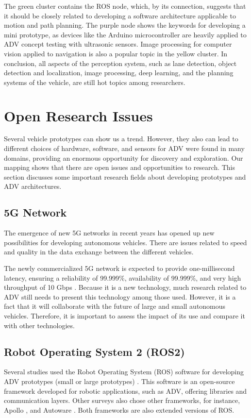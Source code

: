 \documentclass[lettersize,journal]{IEEEtran}
\begin{document}
The green cluster contains the ROS node, which, by its connection, suggests that it should be closely related to developing a software architecture applicable to motion and path planning. The purple node shows the keywords for developing a mini prototype, as devices like the Arduino microcontroller are heavily applied to ADV concept testing with ultrasonic sensors. Image processing for computer vision applied to navigation is also a popular topic in the yellow cluster. In conclusion, all aspects of the perception system, such as lane detection, object detection and localization, image processing, deep learning, and the planning systems of the vehicle, are still hot topics among researchers.

\color{black}
\section{Open Research Issues}

Several vehicle prototypes can show us a trend. However, they also can lead to different choices of hardware, software, and sensors for ADV were found in many domains, providing an enormous opportunity for discovery and exploration. Our mapping shows that there are open issues and opportunities to research. This section discusses some important research fields about developing prototypes and ADV architectures.

\subsection{5G Network}
The emergence of new 5G networks in recent years has opened up new possibilities for developing autonomous vehicles. There are issues related to speed and quality in the data exchange between the different vehicles.

The newly commercialized 5G network is expected to provide one-millisecond latency, ensuring a reliability of 99.999\%, availability of 99.999\%, and very high throughput of 10 Gbps \cite{10.1145/3485767}. Because it is a new technology, much research related to ADV still needs to present this technology among those used. However, it is a fact that it will collaborate with the future of large and small autonomous vehicles. Therefore, it is important to assess the impact of its use and compare it with other technologies.

\subsection{Robot Operating System 2 (ROS2)}
Several studies used the Robot Operating System (ROS) software for developing ADV prototypes (small or large prototypes)
\cite{Gupta2015,Martin2016,Tas2018a,Munir2018,Belcarz2018,Betz2019,Marin-Plaza2019,valera2019design,Reke2020,Angel2020,el2020,Karaman2017,al2018,Gotlib2019,Zhou2019,Wang2019,ILIE2020530,app11167225,10.1145/3556548.3559631}. This software is an open-source framework developed for robotic applications, such as ADV, offering libraries and communication layers. Other surveys also chose other frameworks, for instance, Apollo \cite{Kessler2019} \cite{Buyval2019}, and Autoware \cite{el2020autonomous}. Both frameworks are also extended versions of ROS.
\end{document}
